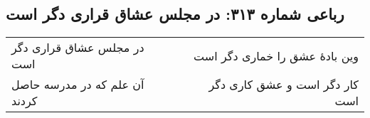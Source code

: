 \begin{center}
\section*{رباعی شماره ۳۱۳: در مجلس عشاق قراری دگر است}
\label{sec:0313}
\begin{longtable}{l p{0.5cm} r}
در مجلس عشاق قراری دگر است
&&
وین بادهٔ عشق را خماری دگر است
\\
آن علم که در مدرسه حاصل کردند
&&
کار دگر است و عشق کاری دگر است
\\
\end{longtable}
\end{center}
